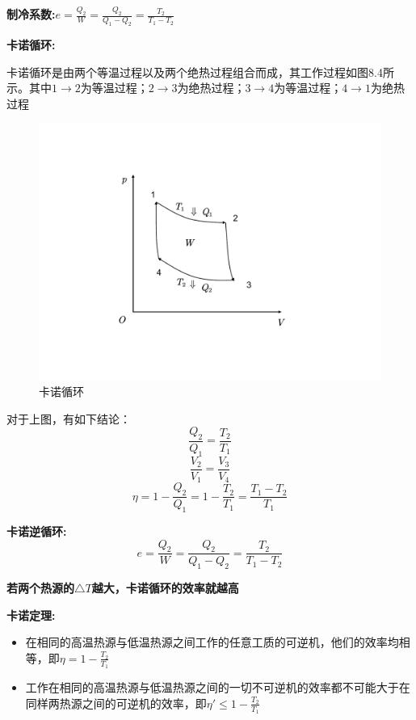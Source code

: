 \documentclass[12pt, a4paper, twoside]{ctexbook}
\begin{document}
\textbf{制冷系数:}$e=\displaystyle \frac{Q_2}{W}=\frac{Q_2}{Q_1-Q_2}=\frac{T_2}{T_1-T_2}$


\textbf{卡诺循环:}

卡诺循环是由两个等温过程以及两个绝热过程组合而成，其工作过程如图8.4所示。其中$1\rightarrow2$为等温过程；$2\rightarrow3$为绝热过程；$3\rightarrow4$为等温过程；$4\rightarrow1$为绝热过程

\begin{figure}[H]

    \centering
\includegraphics[scale=0.6]{Figures/pic4.pdf}  
\caption{卡诺循环}
\label{fig4}
\end{figure}


对于上图，有如下结论：
$$
\frac{Q_2}{Q_1}=\frac{T_2}{T_1}
$$
$$
\frac{V_2}{V_1}=\frac{V_3}{V_4}
$$
$$
\eta=1-\frac{Q_2}{Q_1}=1-\frac{T_2}{T_1}=\frac{T_1-T_2}{T_1}
$$


\textbf{卡诺逆循环:}
$$
e=\frac{Q_2}{W}=\frac{Q_2}{Q_1-Q_2}=\frac{T_2}{T_1-T_2}
$$

\textbf{若两个热源的$\bigtriangleup T$越大，卡诺循环的效率就越高}

\textbf{卡诺定理:}

\begin{itemize}
    \item 在相同的高温热源与低温热源之间工作的任意工质的可逆机，他们的效率均相等，即$\eta=1-\frac{T_2}{T_1}$

    \item 工作在相同的高温热源与低温热源之间的一切不可逆机的效率都不可能大于在同样两热源之间的可逆机的效率，即$\eta'\le 1-\frac{T_2}{T_1}$

\end{itemize}
\end{document}
